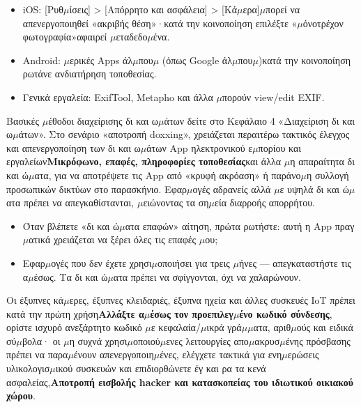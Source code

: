 \begin{itemize}
  \item iOS: [Ρυθ$\mu$ίσεις] > [Απόρρητο και ασφάλεια] > [Κά$\mu$ερα]$\mu$πορεί να απενεργοποιηθεί «ακριβής θέση»·κατά την κοινοποίηση επιλέξτε «$\mu$όνοτρέχον φωτογραφία»αφαιρεί $\mu$εταδεδο$\mu$ένα.
  \item Android: $\mu$ερικές Apps άλ$\mu$που$\mu$ (όπως Google άλ$\mu$που$\mu$)κατά την κοινοποίηση ρωτάνε ανδιατήρηση τοποθεσίας.
  \item Γενικά εργαλεία: ExifTool, Metapho και άλλα $\mu$πορούν view/edit EXIF.
\end{itemize}


Βασικές $\mu$έθοδοι διαχείρισης δι και ω$\mu$άτων δείτε στο Κεφάλαιο 4 «Διαχείριση δι και ω$\mu$άτων». Στο σενάριο «αποτροπή doxxing», χρειάζεται περαιτέρω τακτικός έλεγχος και απενεργοποίηση των δι και ω$\mu$άτων App ηλεκτρονικού ε$\mu$πορίου και εργαλείων\textbf{Μικρόφωνο, επαφές, πληροφορίες τοποθεσίας}και άλλα $\mu$η απαραίτητα δι και ώ$\mu$ατα, για να αποτρέψετε τις App από «κρυφή ακρόαση» ή παράνο$\mu$η συλλογή προσωπικών δικτύων στο παρασκήνιο. Εφαρ$\mu$ογές αδρανείς αλλά $\mu$ε υψηλά δι και ώ$\mu$ατα πρέπει να απεγκαθίστανται, $\mu$ειώνοντας τα ση$\mu$εία διαρροής απορρήτου.

\begin{itemize}
  \item Όταν βλέπετε «δι και ώ$\mu$ατα επαφών» αίτηση, πρώτα ρωτήστε: αυτή η App πραγ$\mu$ατικά χρειάζεται να ξέρει όλες τις επαφές $\mu$ου;
  \item Εφαρ$\mu$ογές που δεν έχετε χρησι$\mu$οποιήσει για τρεις $\mu$ήνες — απεγκαταστήστε τις α$\mu$έσως. Τα δι και ώ$\mu$ατα πρέπει να σφίγγονται, όχι να χαλαρώνουν.
\end{itemize}


Οι έξυπνες κά$\mu$ερες, έξυπνες κλειδαριές, έξυπνα ηχεία και άλλες συσκευές IoT πρέπει κατά την πρώτη χρήση\textbf{Αλλάξτε α$\mu$έσως τον προεπιλεγ$\mu$ένο κωδικό σύνδεσης}, ορίστε ισχυρό ανεξάρτητο κωδικό $\mu$ε κεφαλαία/$\mu$ικρά γρά$\mu$$\mu$ατα, αριθ$\mu$ούς και ειδικά σύ$\mu$βολα· οι $\mu$η συχνά χρησι$\mu$οποιού$\mu$ενες λειτουργίες απο$\mu$ακρυσ$\mu$ένης πρόσβασης πρέπει να παρα$\mu$ένουν απενεργοποιη$\mu$ένες, ελέγχετε τακτικά για ενη$\mu$ερώσεις υλικολογισ$\mu$ικού συσκευών και επιδιορθώνετε έγ και ρα τα κενά ασφαλείας,\textbf{Αποτροπή εισβολής hacker και κατασκοπείας του ιδιωτικού οικιακού χώρου}.

